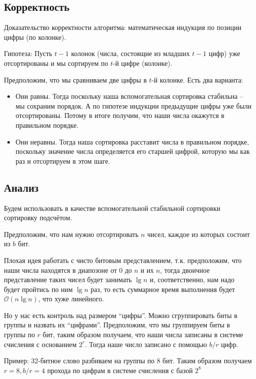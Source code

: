 \documentclass[a4paper,11pt]{article}
\begin{document}
\subsection{Корректность}

Доказательство корректности алгоритма: математическая индукция по позиции цифры
(по колонке).

Гипотеза: Пусть $t-1$ колонок (числа, состоящие из младших $t-1$ цифр) уже
отсортированы и мы сортируем по $t$-й цифре (колонке).

Предположим, что мы сравниваем две цифры в $t$-й колонке. Есть два варианта:

\begin{itemize}
\item Они равны. Тогда поскольку наша вспомогательная сортировка стабильна --
  мы сохраним порядок. А по гипотезе индукции предыдущие цифры уже были
  отсортированы. Потому в итоге получим, что наши числа окажутся в правильном
  порядке.
\item Они неравны. Тогда наша сортировка расставит числа в правильном порядке,
  поскольку значение числа определяется его старшей цифрой, которую мы как раз и
  отсортируем в этом шаге.
\end{itemize}

\subsection{Анализ}
Будем использовать в качестве вспомогательной стабильной сортировки
сортировку подсчётом.

Предположим, что нам нужно отсортировать $n$ чисел, каждое из которых состоит из
$b$ бит.

Плохая идея работать с чисто битовым представлением, т.к. предположим, что наши
числа находятся в диапозоне от $0$ до $n$ и их $n$, тогда двоичное представление
таких чисел будет занимать $\lg n$ и, соответственно, нам надо будет пройтись по
ним $\lg n$ раз, то есть суммарное время выполнения будет $\mathcal{O}(n \lg
n)$, что хуже линейного.

Но у нас есть контроль над размером ``цифры''. Можно сгруппировать биты в группы
и назвать их ``цифрами''. Предположим, что мы группируем биты в группы по $r$
бит, таким образом получаем, что наши числа записаны в системе счисления с
основанием $2^r$. Тогда наше число записано с помощью $b/r$ цифр.

Пример: 32-битное слово разбиваем на группы по 8 бит. Таким образом получаем
$r=8, b/r=4$ прохода по цифрам в системе счисления с базой $2^8$
\end{document}

